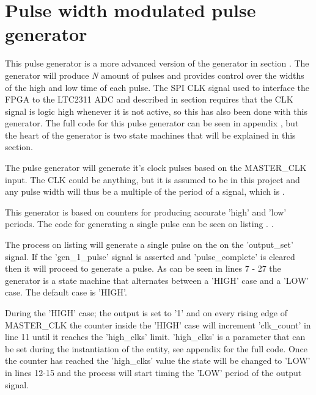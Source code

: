 \section{Pulse width modulated pulse generator} \label{subsec:PWMGen} 

This pulse generator is a more advanced version of the generator in section . The generator will produce \textit{N} amount of pulses and provides control over the widths of the high and low time of each pulse. The SPI CLK signal used to interface the FPGA to the LTC2311 ADC and described in section  requires that the CLK signal is logic high whenever it is not active, so this has also been done with this generator.
The full code for this pulse generator can be seen in appendix , but the heart of the generator is two state machines that will be explained in this section.

The pulse generator will generate it's clock pulses based on the MASTER\_CLK input. The CLK could be anything, but it is assumed to be  in this project and any pulse width will thus be a multiple of the period of a  signal, which is .

This generator is based on counters for producing accurate 'high' and 'low' periods. The code for generating a single pulse can be seen on listing .
. 

The process on listing  will generate a single pulse on the on the 'output\_set' signal. If the 'gen\_1\_pulse' signal is asserted and 'pulse\_complete' is cleared then it will proceed to generate a pulse. As can be seen in lines 7 - 27 the generator is a state machine that alternates between a 'HIGH' case and a 'LOW' case. The default case is 'HIGH'.

During the 'HIGH' case; the output is set to '1' and on every rising edge of MASTER\_CLK the counter inside the 'HIGH' case will increment 'clk\_count' in line 11 until it reaches the 'high\_clks' limit. 'high\_clks' is a parameter that can be set during the instantiation of the entity, see appendix  for the full code. Once the counter has reached the 'high\_clks' value the state will be changed to 'LOW' in lines 12-15 and the process will start timing the 'LOW' period of the output signal.

